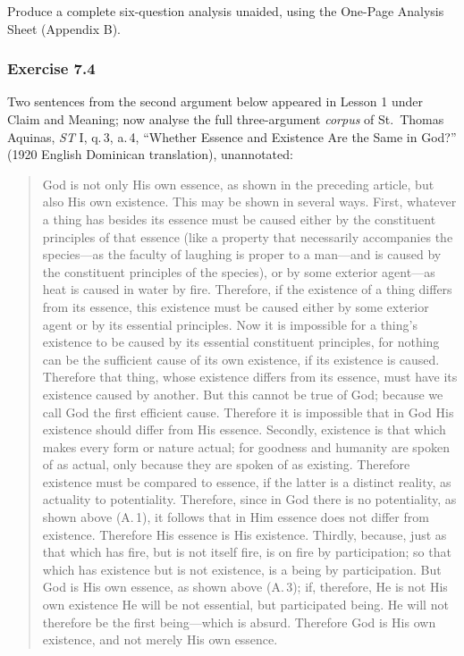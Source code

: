 Produce a complete six-question analysis unaided, using the One-Page Analysis Sheet (Appendix B).

\subsubsection*{Exercise 7.4}
Two sentences from the second argument below appeared in Lesson 1 under Claim and Meaning; now analyse the full three-argument \emph{corpus} of St.\ Thomas Aquinas, \emph{ST} I, q.\,3, a.\,4, ``Whether Essence and Existence Are the Same in God?'' (1920 English Dominican translation), unannotated:

\begin{quote}
God is not only His own essence, as shown in the preceding article, but also His own existence. This may be shown in several ways. First, whatever a thing has besides its essence must be caused either by the constituent principles of that essence (like a property that necessarily accompanies the species---as the faculty of laughing is proper to a man---and is caused by the constituent principles of the species), or by some exterior agent---as heat is caused in water by fire. Therefore, if the existence of a thing differs from its essence, this existence must be caused either by some exterior agent or by its essential principles. Now it is impossible for a thing's existence to be caused by its essential constituent principles, for nothing can be the sufficient cause of its own existence, if its existence is caused. Therefore that thing, whose existence differs from its essence, must have its existence caused by another. But this cannot be true of God; because we call God the first efficient cause. Therefore it is impossible that in God His existence should differ from His essence. Secondly, existence is that which makes every form or nature actual; for goodness and humanity are spoken of as actual, only because they are spoken of as existing. Therefore existence must be compared to essence, if the latter is a distinct reality, as actuality to potentiality. Therefore, since in God there is no potentiality, as shown above (A.\,1), it follows that in Him essence does not differ from existence. Therefore His essence is His existence. Thirdly, because, just as that which has fire, but is not itself fire, is on fire by participation; so that which has existence but is not existence, is a being by participation. But God is His own essence, as shown above (A.\,3); if, therefore, He is not His own existence He will be not essential, but participated being. He will not therefore be the first being---which is absurd. Therefore God is His own existence, and not merely His own essence.
\end{quote}

